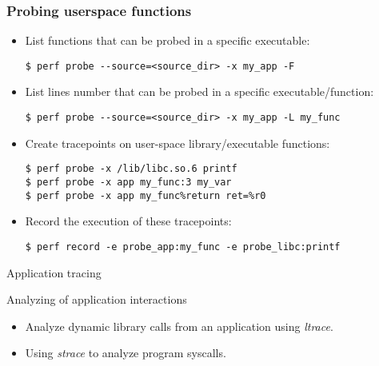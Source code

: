 \begin{frame}[fragile]
  \frametitle{Probing userspace functions}
  \begin{itemize}
    \item List functions that can be probed in a specific
          executable:
  \begin{block}{}
    \begin{verbatim}
$ perf probe --source=<source_dir> -x my_app -F
    \end{verbatim}
  \end{block}
    \item List lines number that can be probed in a specific
          executable/function:
  \begin{block}{}
    \begin{verbatim}
$ perf probe --source=<source_dir> -x my_app -L my_func
    \end{verbatim}
  \end{block}
    \item Create tracepoints on user-space library/executable functions:
  \begin{block}{}
    \begin{verbatim}
$ perf probe -x /lib/libc.so.6 printf
$ perf probe -x app my_func:3 my_var
$ perf probe -x app my_func%return ret=%r0
    \end{verbatim}
  \end{block}
  \item Record the execution of these tracepoints:
  \begin{block}{}
    \begin{verbatim}
$ perf record -e probe_app:my_func -e probe_libc:printf
    \end{verbatim}
  \end{block}
  \end{itemize}
\end{frame}

\setuplabframe
{Application tracing}
{
  Analyzing of application interactions
  \begin{itemize}
    \item Analyze dynamic library calls from an application using
            {\em ltrace}.
    \item Using {\em strace} to analyze program syscalls.
  \end{itemize}
}
